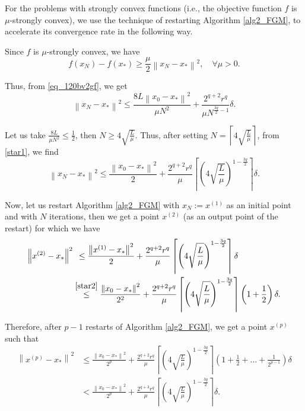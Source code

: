 \documentclass[11pt]{amsart}
\theoremstyle{definition}
\numberwithin{equation}{section}
\begin{document}
For the problems with strongly convex functions (i.e.,  the objective function $f$ is $\mu$-strongly convex), we use the technique of restarting Algorithm \ref{alg2_FGM}, to accelerate its convergence rate in the following way. 

Since $f$ is $\mu$-strongly convex, we have 
\[
    f(x_N) - f(x_*) \geq \frac{\mu}{2} \left\|x_N - x_*\right\|^2, \quad \forall \mu > 0. 
\]

Thus, from \eqref{eq_120bv2gf}, we get 
\begin{equation}\label{star1}
    \left\|x_N - x_*\right\|^2 \leq \frac{8 L \left\|x_0 - x_*\right\|^2}{\mu N^2} + \frac{2^{q+2} r^q}{\mu N^{\frac{3q}{2} - 1}} \delta. 
\end{equation}

Let us take $\frac{8L}{\mu N^2} \leq \frac{1}{2}$, then $N \geq 4 \sqrt{\frac{L}{\mu}}$. Thus, after setting $N = \left\lceil 4 \sqrt{\frac{L}{\mu}} \right\rceil$, from \eqref{star1}, we find 
\begin{equation}\label{star2}
    \left\|x_N - x_*\right\|^2 \leq \frac{\left\|x_0 - x_*\right\|^2}{2} + \frac{2^{q+2} r^q}{\mu} \left\lceil\left( 4 \sqrt{\frac{L}{\mu}}\right)^{1- \frac{3q}{2}} \right\rceil \delta. 
\end{equation}

Now, let us restart Algorithm \ref{alg2_FGM} with $x_N := x^{(1)}$ as an initial point and with $N$ iterations, then we get a point $x^{(2)}$ (as an output point of the restart) for which we have 
\begin{align*}
   \left\|x^{(2)} - x_*\right\|^2 & \; \, \leq \frac{\left\|x^{(1)} - x_*\right\|^2}{2} + \frac{2^{q+2} r^q}{\mu} \left\lceil\left( 4 \sqrt{\frac{L}{\mu}}\right)^{1- \frac{3q}{2}} \right\rceil \delta
   \\& \stackrel{\eqref{star2}}{\leq} \frac{\left\|x_0 - x_*\right\|^2}{2^2} + \frac{2^{q+2} r^q}{\mu} \left\lceil\left( 4 \sqrt{\frac{L}{\mu}}\right)^{1- \frac{3q}{2}} \right\rceil \left( 1 + \frac{1}{2}\right) \delta. 
\end{align*}

Therefore, after $p - 1$ restarts of Algorithm \ref{alg2_FGM}, we get a point $x^{(p)}$ such that  
\begin{align*}
   \left\|x^{(p)} - x_*\right\|^2 & \leq \frac{\left\|x_0 - x_*\right\|^2}{2^p} + \frac{2^{q+2} r^q}{\mu} \left\lceil\left( 4 \sqrt{\frac{L}{\mu}}\right)^{1- \frac{3q}{2}} \right\rceil \left( 1 + \frac{1}{2} + \ldots + \frac{1}{2^{p-1}}\right) \delta
   \\& < \frac{\left\|x_0 - x_*\right\|^2}{2^p} + \frac{2^{q+3} r^q}{\mu} \left\lceil\left( 4 \sqrt{\frac{L}{\mu}}\right)^{1- \frac{3q}{2}} \right\rceil \delta. 
\end{align*}
\end{document}
